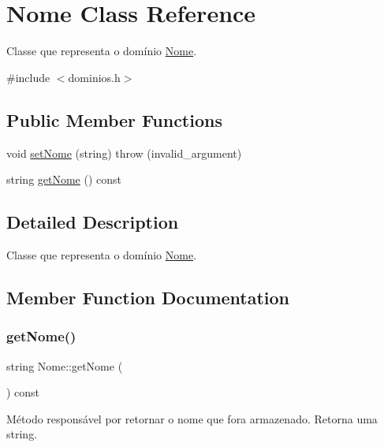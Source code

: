 \hypertarget{classNome}{}\section{Nome Class Reference}
\label{classNome}


Classe que representa o domínio \hyperlink{classNome}{Nome}.  




{\ttfamily \#include $<$dominios.\+h$>$}

\subsection*{Public Member Functions}
\begin{DoxyCompactItemize}
\item 
void \hyperlink{classNome_ab1507b81047efb89b50b6be0d33c08e5}{set\+Nome} (string)  throw (invalid\+\_\+argument)
\item 
string \hyperlink{classNome_a1c08f5b9827a1e97a2631196ff99fdef}{get\+Nome} () const
\end{DoxyCompactItemize}


\subsection{Detailed Description}
Classe que representa o domínio \hyperlink{classNome}{Nome}. 

\subsection{Member Function Documentation}
\mbox{\label{classNome_a1c08f5b9827a1e97a2631196ff99fdef}} 
\subsubsection{\texorpdfstring{get\+Nome()}{getNome()}}
{\footnotesize\ttfamily string Nome\+::get\+Nome (\begin{DoxyParamCaption}{ }\end{DoxyParamCaption}) const\hspace{0.3cm}{\ttfamily [inline]}}

Método responsável por retornar o nome que fora armazenado. Retorna uma string. \mbox{\label{classNome_ab1507b81047efb89b50b6be0d33c08e5}} 

